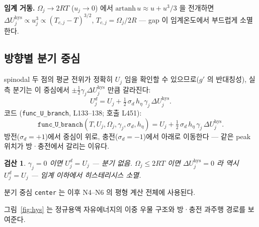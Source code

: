 \documentclass[11pt,a4paper]{article}
\newtheorem*{verifybox}{검산}
\newcommand{\hys}{\mathrm{hys}}
\begin{document}
\textbf{임계 거동.} $\Omega_j\to 2RT$ ($u_j\to0$) 에서 $\mathrm{artanh}\,u\approx u + u^3/3$
을 전개하면 $\Delta U_j^\hys \propto u_j^3 \propto (T_{c,j}-T)^{3/2}$, $T_{c,j}=\Omega_j/2R$
— gap 이 임계온도에서 부드럽게 소멸한다.

\subsection{방향별 분기 중심}

spinodal 두 점의 평균 전위가 정확히 $U_j$ 임을 확인할 수 있으므로($g'$ 의 반대칭성),
실측 분기는 이 중심에서 $\pm\tfrac{1}{2}\gamma_j\Delta U_j^\hys$ 만큼 갈라진다:
\begin{equation}
U_j^d = U_j + \tfrac{1}{2}\,\sigma_d\,h_\eta\,\gamma_j\,\Delta U_j^\hys.
\label{eq:branch}
\end{equation}
코드 (\texttt{func\_U\_branch}, L133--138; 호출 L451):
\begin{equation*}
\texttt{func\_U\_branch}(T,U_j,\Omega_j,\gamma_j,\sigma_d,h_\eta)
= U_j + \tfrac{1}{2}\,\sigma_d\,h_\eta\,\gamma_j\,\Delta U_j^\hys.
\end{equation*}
방전($\sigma_d=+1$)에서 중심이 위로, 충전($\sigma_d=-1$)에서 아래로 이동한다 —
같은 peak 위치가 방·충전에서 갈리는 이유다.

\begin{verifybox}
$\gamma_j=0$ 이면 $U_j^d = U_j$ — 분기 없음. $\Omega_j \le 2RT$ 이면 $\Delta U_j^\hys=0$
라 역시 $U_j^d=U_j$ — 임계 이하에서 히스테리시스 소멸.
\end{verifybox}

분기 중심 \texttt{center} 는 이후 N4--N6 의 평형 계산 전체에 사용된다.

그림~\ref{fig:hys} 는 정규용액 자유에너지의 이중 우물 구조와 방·충전 과주행 경로를
보여준다.
\end{document}
